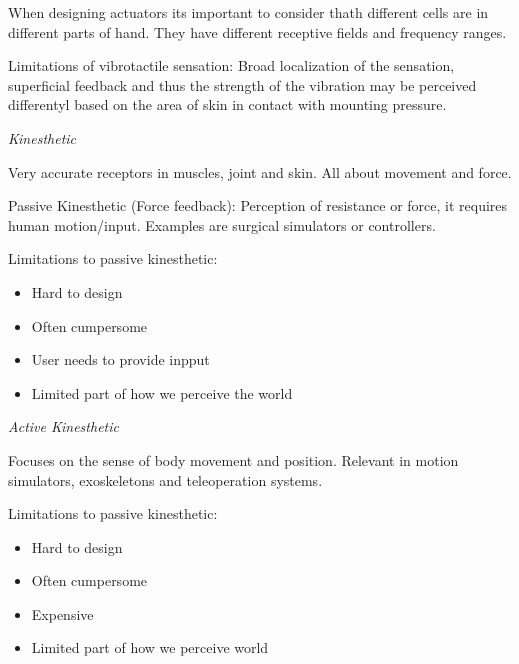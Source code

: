 When designing actuators its important to consider thath different cells are in different parts of hand. 
They have different receptive fields and frequency ranges. \smallskip

Limitations of vibrotactile sensation: Broad localization of the sensation, superficial feedback and thus the strength of the vibration may be perceived differentyl based on the area of skin in contact with mounting pressure. 
\medskip

\textit{Kinesthetic} \smallskip

Very accurate receptors in muscles, joint and skin. All about movement and force.  \smallskip

Passive Kinesthetic (Force feedback): Perception of resistance or force, it requires human motion/input. Examples are surgical simulators or controllers. 


Limitations to passive kinesthetic: 


\begin{itemize}[itemsep=-5pt, topsep=0pt, leftmargin=*]
	\item Hard to design
	\item Often cumpersome
	\item User needs to provide inpput
	\item Limited part of how we perceive the world
\end{itemize}


\textit{Active Kinesthetic} \smallskip

Focuses on the sense of body movement and position. Relevant in motion simulators, exoskeletons and teleoperation systems. 


Limitations to passive kinesthetic: 


\begin{itemize}[itemsep=-5pt, topsep=0pt, leftmargin=*]
	\item Hard to design
	\item Often cumpersome
	\item Expensive
	\item Limited part of how we perceive world
\end{itemize}


